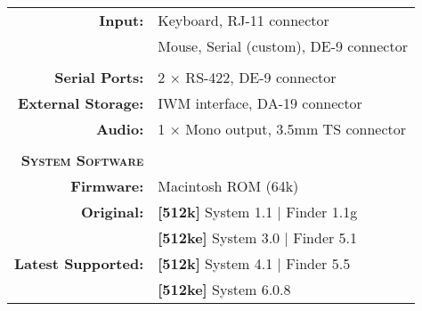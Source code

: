 \begin{tabular}{ r p{6in} }
\\
\textbf{Input:} & Keyboard, RJ-11 connector \\
~ & Mouse, Serial (custom), DE-9 connector \\
\\
\textbf{Serial Ports:} & 2 \(\times\) RS-422, DE-9 connector \\
\textbf{External Storage:} & IWM interface, DA-19 connector \\
\textbf{Audio:} & 1 \(\times\) Mono output, 3.5mm TS connector \\
\\
\textbf{\textsc{System Software}} & ~ \\
\textbf{Firmware:} & Macintosh ROM (64k) \\
\textbf{Original:} & \textbf{[512k]} System 1.1 | Finder 1.1g \\
~ & \textbf{[512ke]} System 3.0 | Finder 5.1 \\
\textbf{Latest Supported:} & \textbf{[512k]} System 4.1 | Finder 5.5 \\
~ & \textbf{[512ke]} System 6.0.8 \\
\end{tabular}